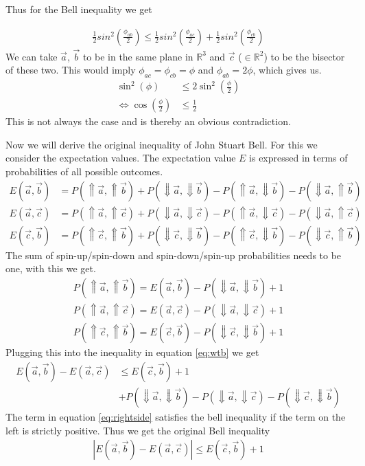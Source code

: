 \documentclass[a4paper]{article}
\begin{document}
Thus for the Bell inequality we get

\begin{align}
    \frac{1}{2}sin^2(\frac{\phi_{ab}}{2}) \leq
    \frac{1}{2}sin^2(\frac{\phi_{ac}}{2})+
    \frac{1}{2}sin^2(\frac{\phi_{cb}}{2})
\end{align}
We can take $\vec{a}$, $\vec{b}$ to be in the same plane in $\mathbb{R}^3$ and
$\vec{c}$ ($\in \mathbb{R}^2$) to be the bisector of these two. This would imply
$\phi_{ac}=\phi_{cb}= \phi$ and $\phi_{ab}=2\phi$, which gives us.
\begin{align}
    \sin^2(\phi) &\leq 2\sin^2(\frac{\phi}{2})\\
    \Leftrightarrow \cos(\frac{\phi}{2}) &\leq \frac{1}{2}
\end{align}
This is not always the case and is thereby an obvious contradiction.

Now we will derive the original inequality of John Stuart Bell\cite{bell}.
For this we consider the expectation values. The expectation value $E$ is expressed
in terms of probabilities of all possible outcomes.
\begin{align}
    E(\vec{a}, \vec{b}) &= P(\Uparrow \vec{a}, \Uparrow \vec{b}) + P(\Downarrow
    \vec{a}, \Downarrow \vec{b}) -P(\Uparrow \vec{a}, \Downarrow \vec{b})
    -P(\Downarrow \vec{a}, \Uparrow \vec{b})\\
    E(\vec{a}, \vec{c}) &= P(\Uparrow \vec{a}, \Uparrow \vec{c}) + P(\Downarrow
    \vec{a}, \Downarrow \vec{c}) -P(\Uparrow \vec{a}, \Downarrow \vec{c})
    -P(\Downarrow \vec{a}, \Uparrow \vec{c})\\
    E(\vec{c}, \vec{b}) &= P(\Uparrow \vec{c}, \Uparrow \vec{b}) + P(\Downarrow
    \vec{c}, \Downarrow \vec{b}) -P(\Uparrow \vec{c}, \Downarrow \vec{b})
    -P(\Downarrow \vec{c}, \Uparrow \vec{b})
\end{align}
The sum of spin-up/spin-down and spin-down/spin-up probabilities needs to be
one, with this we get.
\begin{align}
    P(\Uparrow \vec{a}, \Uparrow \vec{b}) = E(\vec{a}, \vec{b}) - P(\Downarrow
    \vec{a}, \Downarrow \vec{b}) + 1\\
    P(\Uparrow \vec{a}, \Uparrow \vec{c}) = E(\vec{a}, \vec{c}) - P(\Downarrow
    \vec{a}, \Downarrow \vec{c}) + 1\\
    P(\Uparrow \vec{c}, \Uparrow \vec{b}) = E(\vec{c}, \vec{b}) - P(\Downarrow
    \vec{c}, \Downarrow \vec{b}) + 1
\end{align}
Plugging this into the inequality in equation \ref{eq:wtb} we get
\begin{align}
    E(\vec{a}, \vec{b}) - E(\vec{a}, \vec{c}) &\leq E(\vec{c}, \vec{b}) + 1\\
    & + P(\Downarrow \vec{a}, \Downarrow \vec{b}) -P(\Downarrow \vec{a},
    \Downarrow \vec{c}) -P(\Downarrow \vec{c}, \Downarrow \vec{b})
    \label{eq:rightside}
\end{align}
The term in equation \ref{eq:rightside} satisfies the bell inequality if the
term on the left is strictly positive. Thus we get the original Bell inequality
\begin{align}
    |E(\vec{a}, \vec{b}) - E(\vec{a}, \vec{c})| \leq E(\vec{c}, \vec{b}) + 1
\end{align}
\end{document}
